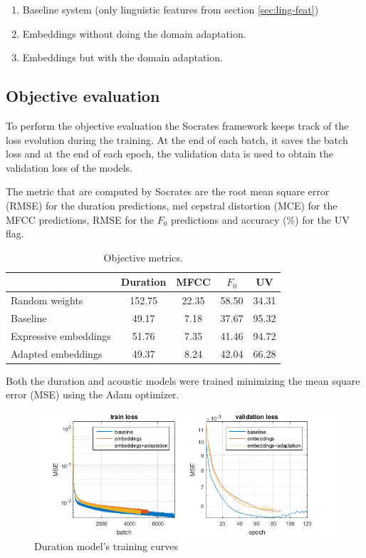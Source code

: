 \begin{enumerate}
    \item Baseline system (only linguistic features from section \ref{sec:ling-feat})
    \item Embeddings without doing the domain adaptation.
    \item Embeddings but with the domain adaptation.
\end{enumerate}

\subsection{Objective evaluation}

To perform the objective evaluation the Socrates framework keeps track of the loss evolution during the training. At the end of each batch, it saves the batch loss and at the end of each epoch, the validation data is used to obtain the validation loss of the models.

The metric that are computed by Socrates are the root mean square error (RMSE) for the duration predictions, mel cepstral distortion \cite{mashimo2001evaluation} (MCE) for the MFCC predictions, RMSE for the $F_0$ predictions and accuracy (\%) for the UV flag. 

\begin{table}[h]
    \centering
    \begin{tabular}{|l|c|c|c|c|}
        \hline
                     & Duration &  MFCC & $F_0$ & UV \\
        \hline
        Random weights  & 152.75   & 22.35 & 58.50 & 34.31 \\
        Baseline     & 49.17    & 7.18  & 37.67 & 95.32 \\
        Expressive embeddings     & 51.76    & 7.35  & 41.46 & 94.72 \\
        Adapted embeddings     & 49.37    & 8.24  & 42.04 & 66.28 \\
        \hline
    \end{tabular}
    \caption{Objective metrics.}
\end{table}

Both the duration and acoustic models were trained minimizing the mean square error (MSE) using the Adam \cite{kingma2014adam} optimizer.

\begin{figure}[h]
    \centering
    \includegraphics[width=14cm]{figures/duration}
    \caption{Duration model's training curves}
\end{figure}

